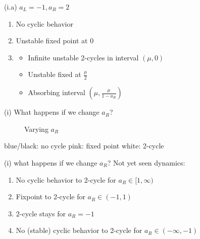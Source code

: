\documentclass{beamer}
\newcounter{n}
\newcounter{f}
\begin{document}
\begin{frame}{(i.a) $a_L = -1, a_R = 2$}
    \begin{enumerate}
        \item[$\mu > 0$] No cyclic behavior
        \item[$\mu = 0$] Unstable fixed point at $0$
        \item[$\mu < 0$] \begin{itemize}
            \item Infinite unstable 2-cycles in interval $(\mu, 0)$
            \item Unstable fixed at $\frac{\mu}{2}$
            \item Absorbing interval $\left(\mu, \frac{\mu}{1 - a_R}\right)$
        \end{itemize}
    \end{enumerate}
\end{frame}

\begin{frame}{(i) What happens if we change $a_R$?}
    \begin{figure}
        \centering
         \qquad
        \caption{Varying $a_R$}
    \end{figure}
    
    blue/black: no cycle
    \hspace*{\fill}
    pink: fixed point
    \hspace*{\fill}
    white: 2-cycle
\end{frame}

\begin{frame}{(i) what happens if we change $a_R$?}
    Not yet seen dynamics:
    \begin{enumerate}
        \item[(0.a)] No cyclic behavior to 2-cycle for $a_R \in [1, \infty)$
        \item[(0.b)] Fixpoint to 2-cycle for $a_R \in (-1, 1)$
        \item[(0.c)] 2-cycle stays for $a_R = -1$
        \item[(0.d)] No (stable) cyclic behavior to 2-cycle for $a_R \in (-\infty, -1)$
    \end{enumerate}
\end{frame}
\end{document}
